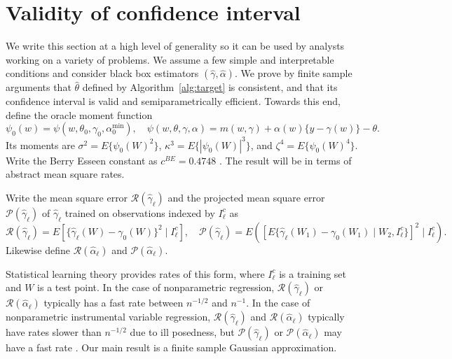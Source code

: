 \section{Validity of confidence interval}\label{sec:dml}

We write this section at a high level of generality so it can be used by analysts working on a variety of problems. We assume a few simple and interpretable conditions and consider black box estimators $(\hat{\gamma},\hat{\alpha})$. We prove by finite sample arguments that $\hat{\theta}$ defined by Algorithm~\ref{alg:target} is consistent, and that its confidence interval is valid and semiparametrically efficient. Towards this end, define the oracle moment function
$$
 \psi_0(w)=\psi(w,\theta_0,\gamma_0,\alpha^{\min}_0), \quad \psi(w,\theta,\gamma,\alpha)=m(w,\gamma)+\alpha(w)\{y-\gamma(w)\}-\theta.
$$
Its moments are $\sigma^2=E\{\psi_0(W)^2\}$, $\kappa^3=E\{|\psi_0(W)|^3\}$, and $\zeta^4=E\{\psi_0(W)^4\}$. Write the Berry Esseen constant as $c^{BE}=0.4748$ \cite{shevtsova2011absolute}. The result will be in terms of abstract mean square rates.%

\begin{definition}
Write the mean square error $\mathcal{R}(\hat{\gamma}_{\ell})$ and the projected mean square error $\mathcal{P}(\hat{\gamma}_{\ell})$ of $\hat{\gamma}_{\ell}$ trained on observations indexed by $I^c_{\ell}$ as
$$
    \mathcal{R}(\hat{\gamma}_{\ell})=E[\{\hat{\gamma}_{\ell}(W)-\gamma_0(W)\}^2\mid I^c_{\ell}],\quad 
     \mathcal{P}(\hat{\gamma}_{\ell})=E([ E\{\hat{\gamma}_{\ell}(W_1)-\gamma_0(W_1)\mid W_2, I^c_{\ell}\} ]^2\mid I^c_{\ell}).
$$
Likewise define $\mathcal{R}(\hat{\alpha}_{\ell})$ and $\mathcal{P}(\hat{\alpha}_{\ell})$.
\end{definition}
Statistical learning theory provides rates of this form, where $I^c_{\ell}$ is a training set and $W$ is a test point. In the case of nonparametric regression, $\mathcal{R}(\hat{\gamma}_{\ell})$ or $\mathcal{R}(\hat{\alpha}_{\ell})$ typically has a fast rate between $n^{-1/2}$ and $n^{-1}$. In the case of nonparametric instrumental variable regression, $\mathcal{R}(\hat{\gamma}_{\ell})$ and $\mathcal{R}(\hat{\alpha}_{\ell})$ typically have rates slower than $n^{-1/2}$ due to ill posedness, but $\mathcal{P}(\hat{\gamma}_{\ell})$ or $\mathcal{P}(\hat{\alpha}_{\ell})$ may have a fast rate \cite{blundell2007semi,singh2019kernel,dikkala2020minimax}. Our main result is a finite sample Gaussian approximation.

